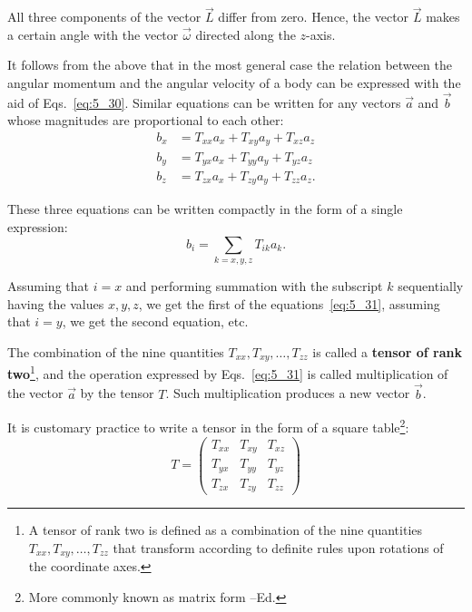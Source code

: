 \noindent
All three components of the vector $\vec{L}$ differ from zero. Hence, the vector $\vec{L}$ makes a certain angle with the vector $\vec{\omega}$ directed along the $z$-axis.

It follows from the above that in the most general case the relation between the angular momentum and the angular velocity of a body can be expressed with the aid of Eqs.~\eqref{eq:5_30}. Similar equations can be written for any vectors $\vec{a}$ and $\vec{b}$ whose magnitudes are proportional to each other:
\begin{align}
	b_x &= T_{xx} a_x + T_{xy} a_y + T_{xz} a_z\nonumber\\
	b_y &= T_{yx} a_x + T_{yy} a_y + T_{yz} a_z \label{eq:5_31} \\
	b_z &= T_{zx} a_x + T_{zy} a_y + T_{zz} a_z.\nonumber
\end{align}

\noindent
These three equations can be written compactly in the form of a single expression:
\vspace{-12pt}
\begin{equation}\label{eq:5_32}
b_i = \sum_{k=x,y,z} T_{ik} a_k.
\end{equation}

\noindent
Assuming that $i=x$ and performing summation with the subscript $k$ sequentially having the values $x,y,z$, we get the first of the equations~\eqref{eq:5_31}, assuming that $i=y$, we get the second equation, etc.

The combination of the nine quantities $T_{xx}, T_{xy}, \ldots, T_{zz}$ is called a \textbf{tensor of rank two}\footnote{A tensor of rank two is defined as a combination of the nine quantities $T_{xx}, T_{xy}, \ldots, T_{zz}$ that transform according to definite rules upon rotations of the coordinate axes.}, and the operation expressed by Eqs.~\eqref{eq:5_31} is called multiplication of the vector $\vec{a}$ by the tensor $T$. Such multiplication produces a new vector $\vec{b}$.

It is customary practice to write a tensor in the form of a square table\footnote{More commonly known as matrix form --Ed.}:
\begin{equation}\label{eq:5_33}
	T = \begin{pmatrix}
		T_{xx}&T_{xy}&T_{xz}\\
		T_{yx}&T_{yy}&T_{yz}\\
		T_{zx}&T_{zy}&T_{zz}
		\end{pmatrix}
\end{equation}


